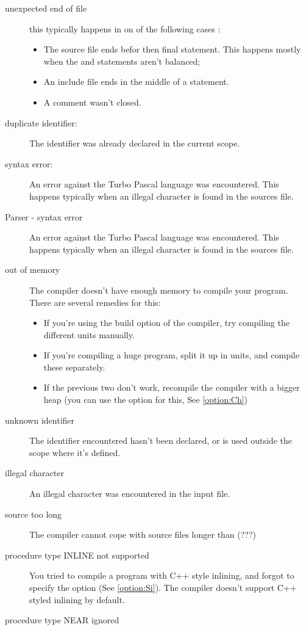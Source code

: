 \documentclass{report}
\newcommand{\seeo}[1]{See \ref{option:#1}}
\begin{document}
\begin{description}
\item [unexpected end of file]
this typically happens in on of the following cases :
\begin{itemize}
\item The source file ends befor then final  statement. This
happens mostly when the  and  statements aren't
balanced;
\item An include file ends in the middle of a statement.
\item A comment wasn't closed.
\end{itemize}
\item [duplicate identifier:]
The identifier was already declared in the current scope.
\item [syntax error:]
An error against the Turbo Pascal language was encountered. This happens
typically when an illegal character is found in the sources file.
\item [Parser - syntax error] 
An error against the Turbo Pascal language was encountered. This happens
typically when an illegal character is found in the sources file.
\item [out of memory]
The compiler doesn't have enough memory to compile your program. There are
several remedies for this:
\begin{itemize}
\item If you're using the build option of the compiler, try compiling the
different units manually.
\item If you're compiling a huge program, split it up in units, and compile
these separately.
\item If the previous two don't work, recompile the compiler with a bigger
heap (you can use the  option for this, \seeo{Ch})
\end{itemize} 
\item [unknown identifier]
The identifier encountered hasn't been declared, or is used outside the
scope where it's defined.
\item [illegal character]
An illegal character was encountered in the input file. 
\item [source too long]
The compiler cannot cope with source files longer than (???)
\item [procedure type INLINE not supported]
You tried to compile a program with C++ style inlining, and forgot to
specify the  option (\seeo{Si}). The compiler doesn't support C++
styled inlining by default. 
\item [procedure type NEAR ignored]

\end{description}
\end{document}
